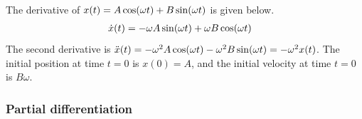 \begin{answer}
	The derivative of $\displaystyle x(t) = A \cos\!\left(\omega t\right) + B \sin\!\left(\omega t\right)$ is given below.
	\begin{align}
		\dot{x}(t) & = -\omega A \sin\!\left(\omega t\right) + \omega B \cos\!\left(\omega t\right)
	\end{align}
	The second derivative is $\ddot{x}(t) = -\omega^2 A \cos\!\left(\omega t\right) - \omega^2 B \sin\!\left(\omega t\right) = -\omega^2 x(t)$.
	The initial position at time $t=0$ is $x(0) = A$, and the initial velocity at time $t=0$ is $B\omega$.
\end{answer}

\subsubsection{Partial differentiation}
\setcounter{answer}{0}

